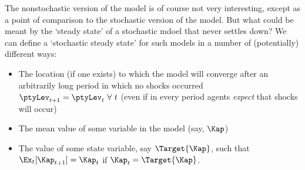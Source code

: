 The nonstochastic version of the model is of course not very interesting, except as a point of comparison to the stochastic version of the model.  But what could be meant by the `steady state' of a stochastic mdoel that never settles down?  We can define a `stochastic steady state' for such models in a number of (potentially) different ways:
\begin{itemize}
\item The location (if one exists) to which the model will converge after an arbitrarily long period in which no shocks occurred $\ptyLev_{t+1}=\ptyLev_{t}~\forall~t$ (even if in every period agents \textit{expect} that shocks will occur)
\item The mean value of some variable in the model (say, $\Kap$)
\item The value of some state variable, say $\Target{\Kap}$, such that $\Ex_{t}[\Kap_{t+1}] = \Kap_{t}$ if $\Kap_{t}=\Target{\Kap}$.
\end{itemize}

